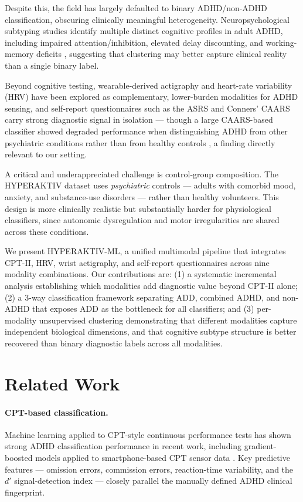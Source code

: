 \documentclass[11pt]{article}
\begin{document}
Despite this, the field has largely defaulted to binary ADHD/non-ADHD classification, obscuring clinically meaningful heterogeneity. Neuropsychological subtyping studies identify multiple distinct cognitive profiles in adult ADHD, including impaired attention/inhibition, elevated delay discounting, and working-memory deficits \citep{mostert2018similar}, suggesting that clustering may better capture clinical reality than a single binary label.

Beyond cognitive testing, wearable-derived actigraphy and heart-rate variability (HRV) have been explored as complementary, lower-burden modalities for ADHD sensing, and self-report questionnaires such as the ASRS and Conners' CAARS carry strong diagnostic signal in isolation --- though a large CAARS-based classifier showed degraded performance when distinguishing ADHD from other psychiatric conditions rather than from healthy controls \citep{christiansen2020machine}, a finding directly relevant to our setting.

A critical and underappreciated challenge is control-group composition. The HYPERAKTIV dataset \citep{hicks2021hyperaktiv} uses \emph{psychiatric} controls --- adults with comorbid mood, anxiety, and substance-use disorders --- rather than healthy volunteers. This design is more clinically realistic but substantially harder for physiological classifiers, since autonomic dysregulation and motor irregularities are shared across these conditions.

We present HYPERAKTIV-ML, a unified multimodal pipeline that integrates CPT-II, HRV, wrist actigraphy, and self-report questionnaires across nine modality combinations. Our contributions are: (1) a systematic incremental analysis establishing which modalities add diagnostic value beyond CPT-II alone; (2) a 3-way classification framework separating ADD, combined ADHD, and non-ADHD that exposes ADD as the bottleneck for all classifiers; and (3) per-modality unsupervised clustering demonstrating that different modalities capture independent biological dimensions, and that cognitive subtype structure is better recovered than binary diagnostic labels across all modalities.

\section{Related Work}

\paragraph{CPT-based classification.} Machine learning applied to CPT-style continuous performance tests has shown strong ADHD classification performance in recent work, including gradient-boosted models applied to smartphone-based CPT sensor data \citep{casals2025machine}. Key predictive features --- omission errors, commission errors, reaction-time variability, and the $d'$ signal-detection index --- closely parallel the manually defined ADHD clinical fingerprint.
\end{document}
